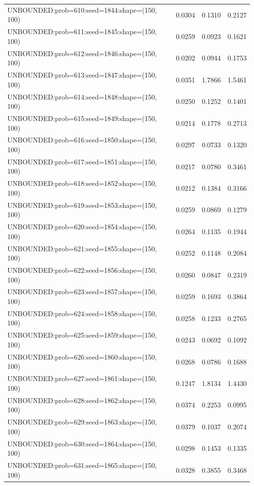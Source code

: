 \begin{longtable}{lccc}
UNBOUNDED:prob=610:seed=1844:shape=(150, 100) &   0.0304 &  0.1310 &  0.2127 \\
UNBOUNDED:prob=611:seed=1845:shape=(150, 100) &   0.0259 &  0.0923 &  0.1621 \\
UNBOUNDED:prob=612:seed=1846:shape=(150, 100) &   0.0202 &  0.0944 &  0.1753 \\
UNBOUNDED:prob=613:seed=1847:shape=(150, 100) &   0.0351 &  1.7866 &  1.5461 \\
UNBOUNDED:prob=614:seed=1848:shape=(150, 100) &   0.0250 &  0.1252 &  0.1401 \\
UNBOUNDED:prob=615:seed=1849:shape=(150, 100) &   0.0214 &  0.1778 &  0.2713 \\
UNBOUNDED:prob=616:seed=1850:shape=(150, 100) &   0.0297 &  0.0733 &  0.1320 \\
UNBOUNDED:prob=617:seed=1851:shape=(150, 100) &   0.0217 &  0.0780 &  0.3461 \\
UNBOUNDED:prob=618:seed=1852:shape=(150, 100) &   0.0212 &  0.1384 &  0.3166 \\
UNBOUNDED:prob=619:seed=1853:shape=(150, 100) &   0.0259 &  0.0869 &  0.1279 \\
UNBOUNDED:prob=620:seed=1854:shape=(150, 100) &   0.0264 &  0.1135 &  0.1944 \\
UNBOUNDED:prob=621:seed=1855:shape=(150, 100) &   0.0252 &  0.1148 &  0.2084 \\
UNBOUNDED:prob=622:seed=1856:shape=(150, 100) &   0.0260 &  0.0847 &  0.2319 \\
UNBOUNDED:prob=623:seed=1857:shape=(150, 100) &   0.0259 &  0.1693 &  0.3864 \\
UNBOUNDED:prob=624:seed=1858:shape=(150, 100) &   0.0258 &  0.1233 &  0.2765 \\
UNBOUNDED:prob=625:seed=1859:shape=(150, 100) &   0.0243 &  0.0692 &  0.1092 \\
UNBOUNDED:prob=626:seed=1860:shape=(150, 100) &   0.0268 &  0.0786 &  0.1688 \\
UNBOUNDED:prob=627:seed=1861:shape=(150, 100) &   0.1247 &  1.8134 &  1.4430 \\
UNBOUNDED:prob=628:seed=1862:shape=(150, 100) &   0.0374 &  0.2253 &  0.0995 \\
UNBOUNDED:prob=629:seed=1863:shape=(150, 100) &   0.0379 &  0.1037 &  0.2074 \\
UNBOUNDED:prob=630:seed=1864:shape=(150, 100) &   0.0298 &  0.1453 &  0.1335 \\
UNBOUNDED:prob=631:seed=1865:shape=(150, 100) &   0.0328 &  0.3855 &  0.3468 \\

\end{longtable}
